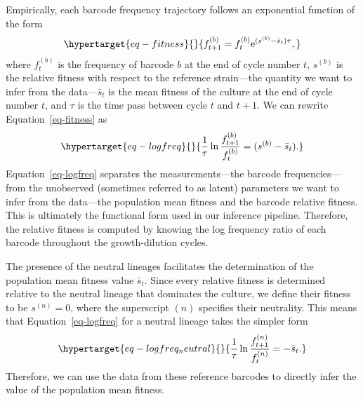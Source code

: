 \documentclass[
]{scrartcl}
\begin{document}
\begin{refsegment}
Empirically, each barcode frequency trajectory follows an exponential
function of the form \autocite{levy2015,kinsler2020,ascensao2023}
\begin{equation}\protect\hypertarget{eq-fitness}{}{
f_{t+1}^{(b)} = f_{t}^{(b)} \mathrm{e}^{(s^{(b)} - \bar{s}_t)\tau},
}\label{eq-fitness}\end{equation} where \(f_{t}^{(b)}\) is the frequency
of barcode \(b\) at the end of cycle number \(t\), \(s^{(b)}\) is the
relative fitness with respect to the reference strain---the quantity we
want to infer from the data---\(\bar{s}_t\) is the mean fitness of the
culture at the end of cycle number \(t\), and \(\tau\) is the time pass
between cycle \(t\) and \(t+1\). We can rewrite
Equation~\ref{eq-fitness} as
\begin{equation}\protect\hypertarget{eq-logfreq}{}{
\frac{1}{\tau}\ln \frac{f_{t+1}^{(b)}}{f_{t}^{(b)}} = (s^{(b)} - \bar{s}_t).
}\label{eq-logfreq}\end{equation} Equation~\ref{eq-logfreq} separates
the measurements---the barcode frequencies---from the unobserved
(sometimes referred to as latent) parameters we want to infer from the
data---the population mean fitness and the barcode relative fitness.
This is ultimately the functional form used in our inference pipeline.
Therefore, the relative fitness is computed by knowing the log frequency
ratio of each barcode throughout the growth-dilution cycles.

The presence of the neutral lineages facilitates the determination of
the population mean fitness value \(\bar{s}_t\). Since every relative
fitness is determined relative to the neutral lineage that dominates the
culture, we define their fitness to be \(s^{(n)} = 0\), where the
superscript \((n)\) specifies their neutrality. This means that
Equation~\ref{eq-logfreq} for a neutral lineage takes the simpler form
\begin{equation}\protect\hypertarget{eq-logfreq_neutral}{}{
\frac{1}{\tau}\ln \frac{f_{t+1}^{(n)}}{f_{t}^{(n)}} = - \bar{s}_t.
}\label{eq-logfreq_neutral}\end{equation} Therefore, we can use the data
from these reference barcodes to directly infer the value of the
population mean fitness.


\end{refsegment}
\end{document}
